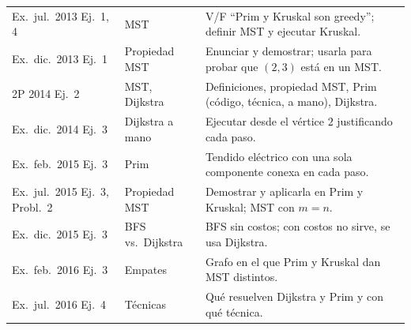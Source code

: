 \begin{center}
\begin{tabularx}{\textwidth}{@{}>{\raggedright\arraybackslash}p{2.8cm}>{\raggedright\arraybackslash}p{2.4cm}>{\raggedright\arraybackslash}X@{}}
Ex.\ jul.~2013 Ej.~1, 4 & MST & V/F ``Prim y Kruskal son greedy''; definir MST y ejecutar Kruskal. \\
Ex.\ dic.~2013 Ej.~1 & Propiedad MST & Enunciar y demostrar; usarla para probar que $(2,3)$ está en un MST. \\
2P 2014 Ej.~2 & MST, Dijkstra & Definiciones, propiedad MST, Prim (código, técnica, a mano), Dijkstra. \\
Ex.\ dic.~2014 Ej.~3 & Dijkstra a mano & Ejecutar desde el vértice $2$ justificando cada paso. \\
Ex.\ feb.~2015 Ej.~3 & Prim & Tendido eléctrico con una sola componente conexa en cada paso. \\
Ex.\ jul.~2015 Ej.~3, Probl.~2 & Propiedad MST & Demostrar y aplicarla en Prim y Kruskal; MST con $m=n$. \\
Ex.\ dic.~2015 Ej.~3 & BFS vs.\ Dijkstra & BFS sin costos; con costos no sirve, se usa Dijkstra. \\
Ex.\ feb.~2016 Ej.~3 & Empates & Grafo en el que Prim y Kruskal dan MST distintos. \\
Ex.\ jul.~2016 Ej.~4 & Técnicas & Qué resuelven Dijkstra y Prim y con qué técnica. \\
\bottomrule
\end{tabularx}
\end{center}

